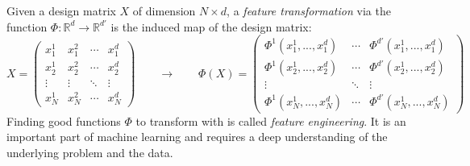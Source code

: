 \begin{framedef}
Given a design matrix $X$ of dimension $N \times d$, a \textit{feature transformation} via the function $\Phi : \mathbb{R}^d \rightarrow \mathbb{R}^{d'}$ is the induced map of the design matrix:
\begin{equation*}
X = \begin{pmatrix} x_1^1 & x_1^2 & \cdots & x_1^d \\ x_2^1 & x_2^2 & \cdots & x_2^d \\ \vdots & \vdots & \ddots & \vdots \\ x_N^1 & x_N^2 & \cdots & x_N^d \end{pmatrix} \qquad \rightarrow \qquad \Phi(X) =\begin{pmatrix} \Phi^1(x_1^1,...,x_1^d) & \cdots & \Phi^{d'}(x_1^1,...,x_1^d) \\ \Phi^1(x_2^1,...,x_2^d) & \cdots & \Phi^{d'}(x_2^1,...,x_2^d) \\ \vdots & \ddots & \vdots \\ \Phi^1(x_N^1,...,x_N^d) & \cdots & \Phi^{d'}(x_N^1,...,x_N^d)\end{pmatrix}
\end{equation*}
Finding good functions $\Phi$ to transform with is called \textit{feature engineering}. It is an important part of machine learning and requires a deep understanding of the underlying problem and the data.
\end{framedef}

